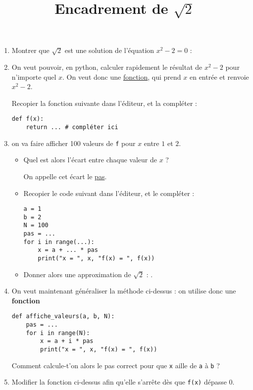 \documentclass[
	classe=$2^{de}$,
]
{informatique}
\title{Encadrement de $\sqrt{2}$}
\begin{document}
\maketitle

\begin{enumerate}
	\item Montrer que $\sqrt{2}$ est une solution de l'équation $x^2 - 2 = 0$ :

	\item On veut pouvoir, en python, calculer rapidement le résultat de $x^2 - 2$ pour n'importe quel $x$. On veut donc une \uline{fonction}, qui prend $x$ en entrée et renvoie $x^2 - 2$.

	      Recopier la fonction suivante dans l'éditeur, et la compléter :

	      \begin{lstlisting}
def f(x):
    return ... # compléter ici
	      \end{lstlisting}
	\item on va faire afficher 100 valeurs de \texttt{f} pour $x$ entre $1$ et $2$.

	      \begin{itemize}
		      \item Quel est alors l'écart entre chaque valeur de $x$ ? 

		            On appelle cet écart le \uline{pas}.
		      \item Recopier le code suivant dans l'éditeur, et le compléter :
		            \begin{lstlisting}
a = 1
b = 2
N = 100
pas = ...
for i in range(...):
	x = a + ... * pas
	print("x = ", x, "f(x) = ", f(x))
			        \end{lstlisting}
		      \item Donner alors une approximation de $\sqrt{2}$ : .
	      \end{itemize}
	\item On veut maintenant généraliser la méthode ci-dessus : on utilise donc une \textbf{fonction}
	      \begin{lstlisting}
def affiche_valeurs(a, b, N):
    pas = ...
    for i in range(N):
        x = a + i * pas
        print("x = ", x, "f(x) = ", f(x))
	      \end{lstlisting}

	      Comment calcule-t'on alors le pas correct pour que \texttt{x} aille de \texttt{a} à \texttt{b} ? 
	\item Modifier la fonction ci-dessus afin qu'elle s'arrête dès que \texttt{f(x)} dépasse 0.


\end{enumerate}
\end{document}
